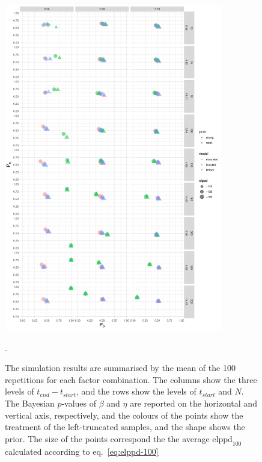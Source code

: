 \begin{figure}[tbp]
    \centering
    \includegraphics[width=0.85\textwidth]{./figures/ch-2/sim-results-pvalues.pdf}
    \caption{The simulation results are summarised by the mean of the 100 repetitions for each factor combination. The columns show the three levels of $t_{end} - t_{start}$, and the rows show the levels of $t_{start}$ and $N$. The Bayesian $p$-values of $\beta$ and $\eta$ are reported on the horizontal and vertical axis, respectively, and the colours of the points show the treatment of the left-truncated samples, and the shape shows the prior. The size of the points correspond the the average $\text{elppd}_{100}$ calculated according to eq.~\eqref{eq:elppd-100}}.
    \label{fig:sim-study-pvalue}
\end{figure}

